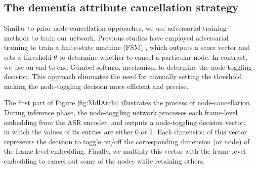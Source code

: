 \documentclass[lettersize,journal]{IEEEtran}
\begin{document}
\subsection{The dementia attribute cancellation strategy}
\label{ssec:strategy}
Similar to prior node-cancellation approaches, we use adversarial training methods to train our network. Previous studies have employed adversarial training to train a finite-state machine (FSM) \cite{huang2022attention}, which outputs a score vector and sets a threshold $\theta$ to determine whether to cancel a particular node. In contrast, we use an end-to-end Gumbel-softmax mechanism to determine the node-toggling decision. This approach eliminates the need for manually setting the threshold, making the node-toggling decision more efficient and precise.

The first part of Figure \ref{fig:MdlArchi} illustrates the process of node-cancellation. During inference phase, the node-toggling network processes each frame-level embedding from the ASR encoder, and outputs a node-toggling decision vector, in which the values of its entries are either 0 or 1. Each dimension of this vector represents the decision to toggle on/off the corresponding dimension (or node) of the frame-level embedding. Finally, we multiply this vector with the frame-level embedding to cancel out some of the nodes while retaining others.
\end{document}
